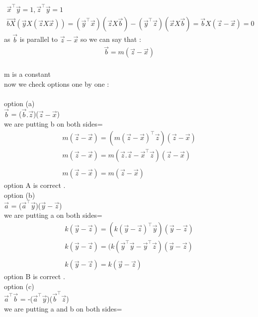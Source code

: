 \documentclass[journal,12pt,onecolumn]{IEEEtran}
\begin{document}
\\
\begin{align*}
\\
    \vec{x}^\top\vec{y}=1,\vec{z}^\top\vec{y}=1
    \\ 
    \vec{bX}(\vec{y}X(\vec{z} X \vec{x}))=(\vec{y}^\top\vec{x})(\vec{z}X\vec{b})-(\vec{y}^\top\vec{z})(\vec{x}X\vec{b})=\vec{b}X(\vec{z}-\vec{x})=0 
\end{align*}
as $\vec{b}$ is parallel to $\vec{z}-\vec{x}$ so we can say that :
\begin{align*}
    \vec{b}=m(\vec{z}-\vec{x})
\end{align*}
\\
m is a  constant
\\
now we check options one by one :
\\
\\
option (a)
\\
$\vec{b}$ = ($\vec{b}.\vec{z}$)($\vec{z}-\vec{x}$)
\\
we are putting b on both sides=
\\
 \begin{align*}
    m(\vec{z}-\vec{x})=( m(\vec{z}-\vec{x})^\top\vec{z})(\vec{z}-\vec{x}) 
    \\
    m(\vec{z}-\vec{x})=m(\vec{z}.\vec{z}-\vec{x}^\top\vec{z})(\vec{z}-\vec{x}) 
    \\
    \\
     m(\vec{z}-\vec{x})= m(\vec{z}-\vec{x})
 \end{align*}
 option A is correct . 
 \\
 option (b)
\\
$\vec{a}$ = ($\vec{a}^\top\vec{y}$)($\vec{y}-\vec{z}$)
\\
we are putting a on both sides=
\\
 \begin{align*}
   k(\vec{y}-\vec{z})=(k(\vec{y}-\vec{z})^\top\vec{y})(\vec{y}-\vec{z})
    \\
    k(\vec{y}-\vec{z})=(k(\vec{y}^\top\vec{y}-\vec{y}^\top\vec{z})(\vec{y}-\vec{z})
    \\
    \\
     k(\vec{y}-\vec{z})= k(\vec{y}-\vec{z})
 \end{align*}
 option B is correct .
\\  
 option (c)
\\
$\vec{a}^\top\vec{b}$ = -($\vec{a}^\top\vec{y}$)($\vec{b}^\top\vec{z}$)
\\
we are putting a and b on both sides=
\\
\end{document}
